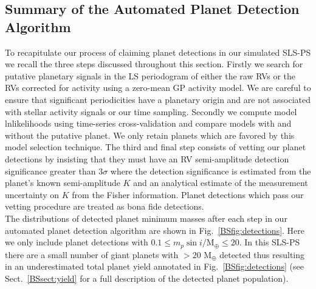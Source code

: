 \subsection{Summary of the Automated Planet Detection Algorithm}
To recapitulate our process of claiming planet detections in our simulated SLS-PS we
recall the three steps discussed throughout this section. Firstly we search for putative
planetary signals in the LS periodogram of either the raw RVs or the RVs corrected for activity using a
zero-mean GP activity model. We are careful to ensure that significant periodicities have a
planetary origin and are not associated with stellar activity signals or our time sampling. Secondly we
compute model lnlikelihoods using time-series cross-validation and compare models with and without the
putative planet. We only retain planets which are favored by this model selection technique. The third and
final step consists of vetting our planet detections by insisting that they must have an RV semi-amplitude
detection significance greater than $3\sigma$ where the detection significance is estimated from the
planet's known semi-amplitude $K$ and an analytical estimate of the measurement uncertainty on $K$ from
the Fisher information. Planet detections which pass our vetting procedure are treated as bona fide
detections. \\

The distributions of detected planet minimum masses after each step in our automated planet detection
algorithm are shown in Fig.~\ref{BSfig:detections}. Here we only include planet detections with
$0.1 \leq m_p\sin{i}/\text{M}_{\oplus} \leq 20$. In this SLS-PS there are a small number of giant planets
with \msini{} $> 20$ M$_{\oplus}$ detected thus resulting in an underestimated total planet yield annotated
in Fig.~\ref{BSfig:detections} (see Sect.~\ref{BSsect:yield} for a full description of the detected planet
population). \\

